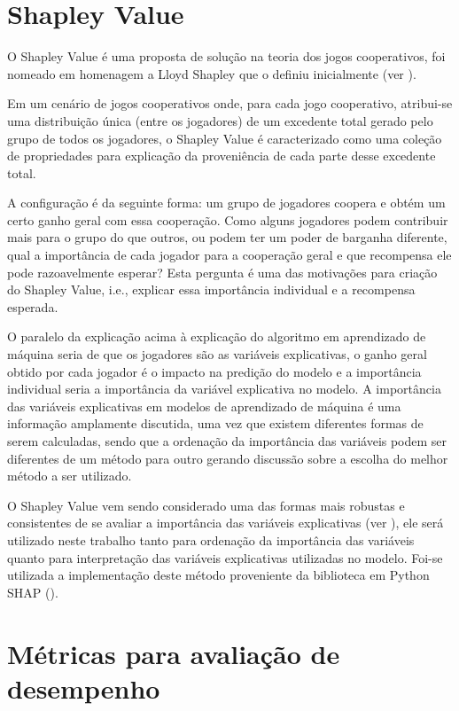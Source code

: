 \section{Shapley Value}
\label{sec:shapley_value}

O Shapley Value é uma proposta de solução na teoria dos jogos cooperativos, foi nomeado em homenagem a Lloyd Shapley que o definiu inicialmente (ver \citet{Shapley1953}).

Em um cenário de jogos cooperativos onde, para cada jogo cooperativo, atribui-se uma distribuição única (entre os jogadores) de um excedente total gerado pelo grupo de todos os jogadores, o Shapley Value é caracterizado como uma coleção de propriedades para explicação da proveniência de cada parte desse excedente total.

A configuração é da seguinte forma: um grupo de jogadores coopera e obtém um certo ganho geral com essa cooperação. Como alguns jogadores podem contribuir mais para o grupo do que outros, ou podem ter um poder de barganha diferente, qual a importância de cada jogador para a cooperação geral e que recompensa ele pode razoavelmente esperar? Esta pergunta é uma das motivações para criação do Shapley Value, i.e., explicar essa importância individual e a recompensa esperada.

O paralelo da explicação acima à explicação do algoritmo em aprendizado de máquina seria de que os jogadores são as variáveis explicativas, o ganho geral obtido por cada jogador é o impacto na predição do modelo e a importância individual seria a importância da variável explicativa no modelo. A importância das variáveis explicativas em modelos de aprendizado de máquina é uma informação amplamente discutida, uma vez que existem diferentes formas de serem calculadas, sendo que a ordenação da importância das variáveis podem ser diferentes de um método para outro gerando discussão sobre a escolha do melhor método a ser utilizado.

O Shapley Value vem sendo considerado uma das formas mais robustas e consistentes de se avaliar a importância das variáveis explicativas (ver \citet{Lundberg2017}), ele será utilizado neste trabalho tanto para ordenação da importância das variáveis quanto para interpretação das variáveis explicativas utilizadas no modelo. Foi-se utilizada a implementação deste método proveniente da biblioteca em Python SHAP (\citet{Shap}).

\section{Métricas para avaliação de desempenho}
\label{sec:metricas_avaliacao}

